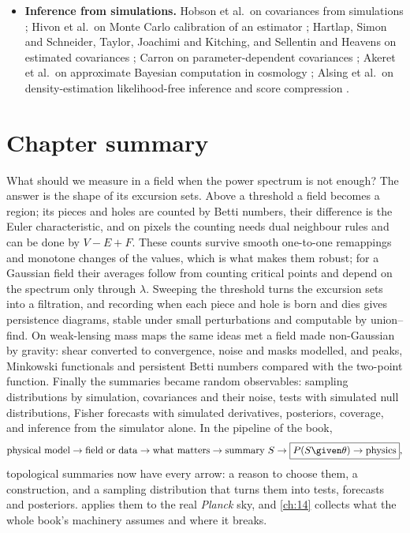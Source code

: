 \begin{itemize}[itemsep=2pt,leftmargin=1.2em]
        \cite{Hikage2019HSC,Asgari2021KiDS,Amon2022DES}.
  \item \textbf{Inference from simulations.} Hobson et al.\ on covariances from simulations ; Hivon et al.\ on
        Monte Carlo calibration of an estimator ; Hartlap, Simon and Schneider, Taylor, Joachimi and Kitching, and
        Sellentin and Heavens on estimated covariances \cite{Hartlap2007,Taylor2013,SellentinHeavens2016}; Carron on parameter-dependent
        covariances \cite{Carron2013}; Akeret et al.\ on approximate Bayesian computation in cosmology \cite{Akeret2015}; Alsing et al.\ on
        density-estimation likelihood-free inference and score compression \cite{Alsing2019}.
\end{itemize}

\section*{Chapter summary}
\label{12c:sec:summary}

What should we measure in a field when the power spectrum is not enough? The answer is the shape of its excursion sets. Above
a threshold a field becomes a region; its pieces and holes are counted by Betti numbers, their difference is the Euler characteristic, and on
pixels the counting needs dual neighbour rules and can be done by $V-E+F$. These counts survive smooth one-to-one remappings and monotone
changes of the values, which is what makes them robust; for a Gaussian field their averages follow from counting critical points and depend
on the spectrum only through $\lambda$. Sweeping the threshold turns the excursion sets into a filtration, and recording when each piece and
hole is born and dies gives persistence diagrams, stable under small perturbations and computable by union--find. On weak-lensing mass maps
the same ideas met a field made non-Gaussian by gravity: shear converted to convergence, noise and masks modelled, and peaks, Minkowski
functionals and persistent Betti numbers compared with the two-point function. Finally the summaries became random observables: sampling
distributions by simulation, covariances and their noise, tests with simulated null distributions, Fisher forecasts with simulated
derivatives, posteriors, coverage, and inference from the simulator alone. In the pipeline of the book,
\[
  \text{physical model}\to\text{field or data}\to\text{what matters}\to\text{summary }S\to\boxed{P(S\given\theta)\to\text{physics}},
\]
topological summaries now have every arrow: a reason to choose them, a construction, and a sampling distribution that turns them into tests, forecasts and posteriors.  applies them to the real \textit{Planck} sky, and
\cref{ch:14} collects what the whole book's machinery assumes and where it breaks.

